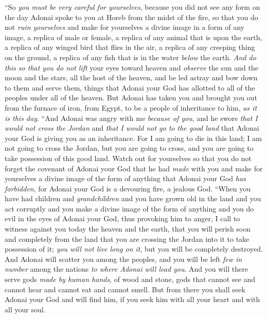 \begin{biblechapter}
\verse “So \textit{you must be very careful for yourselves}, because you did not see any form on the day Adonai spoke to you at Horeb from the midst of the fire,
\verse so that you do not \textit{ruin yourselves} and make for yourselves a divine image in a form of any image, a replica of male or female,
\verse a replica of any animal that is upon the earth, a replica of any winged bird that flies in the air,
\verse a replica of any creeping thing on the ground, a replica of any fish that is in the water \textit{below} the earth.
\verse \textit{And do this so that you do not lift} your eyes toward heaven and \textit{observe} the sun and the moon and the stars, all the host of the heaven, and be led astray and bow down to them and serve them, things that Adonai your God has allotted to all of the peoples under all of the heaven.
\verse But Adonai has taken you and brought you out from the furnace of iron, from Egypt, to be a people of inheritance to him, \textit{as it is this day}.
\verse “And Adonai was angry with me \textit{because of you}, and he swore \textit{that I would not cross the Jordan} and \textit{that I would not go to the good land} that Adonai your God is giving you as an inheritance.
\verse For I am going to die in this land; I am not going to cross the Jordan, but you are going to cross, and you are going to take possession of this good land.
\verse Watch out for yourselves so that you do not forget the covenant of Adonai your God that he had \textit{made} with you and make for yourselves a divine image of the form of anything that Adonai your God \textit{has forbidden},
\verse for Adonai your God is a devouring fire, a jealous God.
\verse “When you have had children and \textit{grandchildren} and you have grown old in the land and you act corruptly and you make a divine image of the form of anything and you do evil in the eyes of Adonai your God, thus provoking him to anger,
\verse I call to witness against you today the heaven and the earth, that you will perish soon and completely from the land that you are crossing the Jordan into it to take possession of it; \textit{you will not live long on it}, but you will be completely destroyed.
\verse And Adonai will scatter you among the peoples, and you will be left \textit{few in number} among the nations \textit{to where Adonai will lead you}.
\verse And you will there serve gods \textit{made by human hands}, of wood and stone, gods that cannot see and cannot hear and cannot eat and cannot smell.
\verse But from there you shall seek Adonai your God and will find him, if you seek him with all your heart and with all your soul.

\end{biblechapter}
